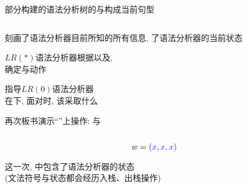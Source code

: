\begin{frame}{}
  \begin{center}
    部分构建的语法分析树的与构成当前句型

    \vspace{0.30cm}
    \begin{columns}
    \end{columns}

    \vspace{0.60cm}
    刻画了语法分析器目前所知的所有信息, 了语法分析器的当前状态

    \vspace{0.60cm}
    $LR(\ast)$语法分析器根据以及, \\[6pt]
    确定与动作
  \end{center}
\end{frame}

\begin{frame}{}
  \begin{center}

    \vspace{0.60cm}
    指导$LR(0)$语法分析器 \\[6pt]
    在下, 面对时, 该采取什么
  \end{center}
\end{frame}

\begin{frame}{}
  \begin{center}

    \vspace{0.30cm}
    
  \end{center}
\end{frame}

\begin{frame}{}
  \begin{center}
    再次板书演示``''上操作: 与

    \begin{columns}
        
    \end{columns}

    \[
      w = \textcolor{blue}{(x, x, x)}
    \]

    这一次, 中包含了语法分析器的状态 \\[6pt]
    (文法符号与状态都会经历入栈、出栈操作)
  \end{center}
\end{frame}

